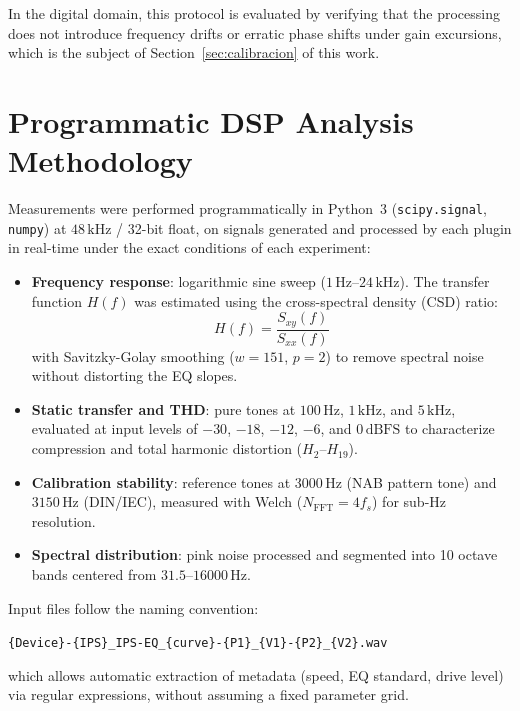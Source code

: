 \documentclass[10pt,conference]{IEEEtran}
\begin{document}
In the digital domain, this protocol is evaluated by verifying that the processing does not introduce
frequency drifts or erratic phase shifts under gain excursions, which is the subject of
Section~\ref{sec:calibracion} of this work.

\section{Programmatic DSP Analysis Methodology}

Measurements were performed programmatically in Python~3 (\texttt{scipy.signal}, \texttt{numpy})
at $48\,\text{kHz}$ / 32-bit float, on signals generated and processed by each plugin in real-time
under the exact conditions of each experiment:

\begin{itemize}
    \item \textbf{Frequency response}: logarithmic sine sweep ($1\,\text{Hz}$–$24\,\text{kHz}$).
    The transfer function $H(f)$ was estimated using the cross-spectral density (CSD) ratio:
    \begin{equation}
        H(f) = \frac{S_{xy}(f)}{S_{xx}(f)}
    \end{equation}
    with Savitzky-Golay smoothing ($w=151$, $p=2$) to remove spectral noise without distorting the EQ slopes.

    \item \textbf{Static transfer and THD}: pure tones at $100\,\text{Hz}$, $1\,\text{kHz}$, and $5\,\text{kHz}$,
    evaluated at input levels of $-30$, $-18$, $-12$, $-6$, and $0\,\text{dBFS}$ to characterize compression
    and total harmonic distortion ($H_2$–$H_{19}$).

    \item \textbf{Calibration stability}: reference tones at $3000\,\text{Hz}$ (NAB pattern tone) and
    $3150\,\text{Hz}$ (DIN/IEC), measured with Welch ($N_{\text{FFT}}=4f_s$) for sub-Hz resolution.

    \item \textbf{Spectral distribution}: pink noise processed and segmented into 10 octave bands
    centered from $31.5$–$16000\,\text{Hz}$.
\end{itemize}

Input files follow the naming convention:
\begin{center}
\texttt{\{Device\}-\{IPS\}\_IPS-EQ\_\{curve\}-\{P1\}\_\{V1\}-\{P2\}\_\{V2\}.wav}
\end{center}
which allows automatic extraction of metadata (speed, EQ standard, drive level) via regular expressions,
without assuming a fixed parameter grid.
\end{document}
